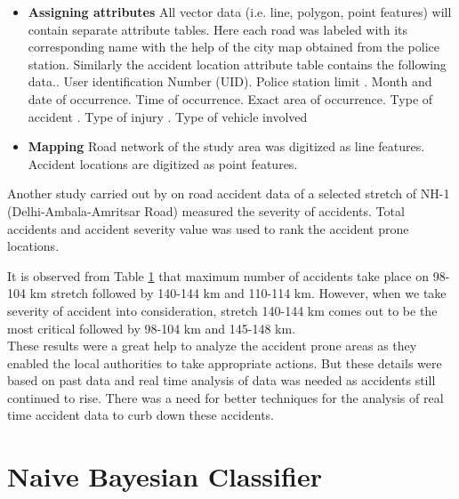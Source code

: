 \documentclass[journal]{IEEEtran}
\begin{document}
\begin{itemize}
\begin{table}[ht]
\begin{tabular}{|p{1cm}|p{2cm}|p{1cm}|p{1.5cm}|p{1cm}|p{1cm}|p{1cm}|p{2cm}|p{2cm}|}
			\hline 
		\end{tabular}
		\label{Accident Prone Locations by ASV}
	\end{table}
	
	\item\textbf{Assigning attributes}
	All vector data (i.e. line, polygon, point features) will contain separate attribute tables. Here each road was labeled with its corresponding name with the help of the city map obtained from the police station. Similarly the accident location attribute table contains the following data.. User identification Number (UID). Police station limit . Month and date of occurrence. Time of occurrence. Exact area of occurrence. Type of accident . Type of injury . Type of vehicle involved
	\item\textbf{Mapping}
	Road network of the study area was digitized as line features. Accident locations are digitized as point features.
\end{itemize}
Another study carried out by \cite{nh1} on road accident data of a selected stretch of NH-1 (Delhi-Ambala-Amritsar Road) measured the severity of accidents. Total accidents and accident severity value was used to rank the accident prone locations.
 
It is observed from Table \ref{Accident Prone Locations by ASV} that maximum number of accidents take place on 98-104 km stretch followed by 140-144 km and 110-114 km. However, when we take severity of accident into consideration, stretch 140-144 km comes out to be the most critical followed by 98-104 km and 145-148 km\cite{nh1}.\\
These results were a great help to analyze the accident prone areas as they enabled the local authorities to take appropriate actions. But these details were based on past data and real time analysis of data was needed as accidents still continued to rise. There was a need for better techniques for the analysis of real time accident data to curb down these accidents.

\newcommand{\argmax}{\arg\!\max}
\section{Naive Bayesian Classifier}
\end{document}
